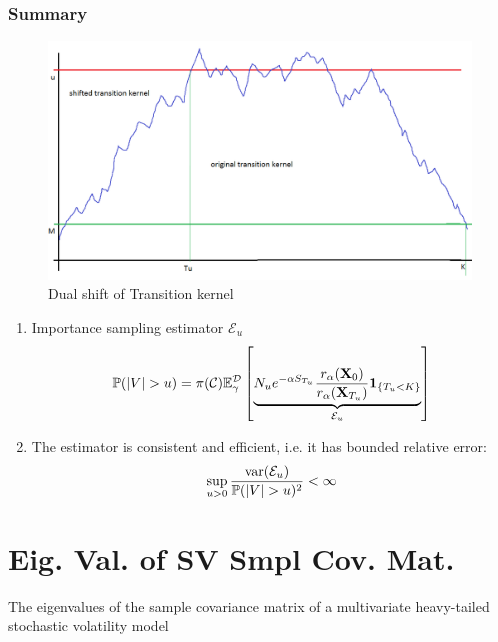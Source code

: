 \documentclass{beamer}
\begin{document}
\begin{frame}
  \frametitle{Summary}
  \begin{minipage}[t]{0.4\linewidth}
    \begin{figure}
      \centering
      \includegraphics[width=1.0\linewidth]{pic1.png}
      \caption{\footnotesize Dual shift of Transition kernel}
    \end{figure}
  \end{minipage}\hfill
  \begin{minipage}[t]{0.6\linewidth}
    \begin{scriptsize}
      \begin{enumerate}
      \item Importance sampling estimator $\mathcal E_u$
        \[
        \mathbb{P}(|V| > u)
        =
        \pi(\mathcal C) \mathbb{E}_\gamma^{\mathcal D} \left[
          \underbrace{
            N_u e^{-\alpha S_{T_u}} {r_\alpha(\mathbf{X}_0) \over r_\alpha(\mathbf{X}_{T_u})} \mathbf{1}_{\{T_u < K\}}
          }_{\mathcal E_u}
        \right]
        \]
      \item The estimator is consistent and efficient, i.e. it has bounded relative error:
        \[
        \sup_{u > 0} {
          \text{var}(\mathcal E_u)
          \over
          \mathbb{P}(|V| > u)^2
        } < \infty
        \]
      \end{enumerate}
    \end{scriptsize}
  \end{minipage}
\end{frame}

\section{Eig. Val. of SV Smpl Cov. Mat.}
\begin{frame}
  The eigenvalues of the sample covariance matrix of a multivariate heavy-tailed 
  stochastic volatility model  
\end{frame}
\end{document}
